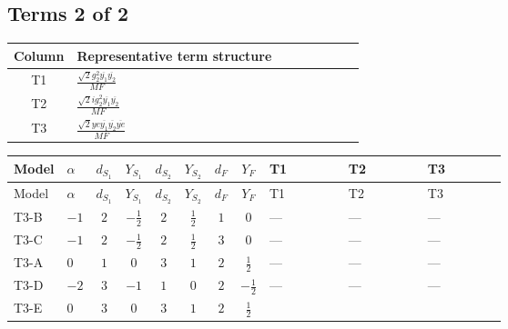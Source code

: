 \documentclass[8pt]{article}
\begin{document}
\begin{landscape}
\subsection*{Terms 2 of 2}
\begin{center}
\begin{tabular}{@{}c >{\raggedright\arraybackslash}p{0.82\linewidth}@{}}
\toprule
Column & Representative term structure \\
\midrule
T1 & \(\displaystyle \frac{\sqrt{2} g_{2}^{2} \overline{y_{1}} \overline{y_{2}}}{MF}\) \\
\midrule
T2 & \(\displaystyle \frac{\sqrt{2} i g_{2}^{2} \overline{y_{1}} \overline{y_{2}}}{MF}\) \\
\midrule
T3 & \(\displaystyle \frac{\sqrt{2} ye \overline{y_{1}} \overline{y_{2}} \overline{ye}}{MF}\) \\
\midrule
\bottomrule
\end{tabular}
\end{center}
\smallskip
\tiny
\begin{longtable}{@{}llcccccc >{\raggedright\arraybackslash}p{0.21\linewidth} >{\raggedright\arraybackslash}p{0.21\linewidth} >{\raggedright\arraybackslash}p{0.21\linewidth}@{}}
\toprule
Model & $\alpha$ & $d_{S_1}$ & $Y_{S_1}$ & $d_{S_2}$ & $Y_{S_2}$ & $d_F$ & $Y_F$ & T1 & T2 & T3 \\
\midrule
\endfirsthead
\toprule
Model & $\alpha$ & $d_{S_1}$ & $Y_{S_1}$ & $d_{S_2}$ & $Y_{S_2}$ & $d_F$ & $Y_F$ & T1 & T2 & T3 \\
\midrule
\endhead
T3-B & $-1$ & $2$ & $-\frac{1}{2}$ & $2$ & $\frac{1}{2}$ & $1$ & $0$ & --- & --- & --- \\
\midrule
T3-C & $-1$ & $2$ & $-\frac{1}{2}$ & $2$ & $\frac{1}{2}$ & $3$ & $0$ & --- & --- & --- \\
\midrule
T3-A & $0$ & $1$ & $0$ & $3$ & $1$ & $2$ & $\frac{1}{2}$ & --- & --- & --- \\
\midrule
T3-D & $-2$ & $3$ & $-1$ & $1$ & $0$ & $2$ & $-\frac{1}{2}$ & --- & --- & --- \\
\midrule
T3-E & $0$ & $3$ & $0$ & $3$ & $1$ & $2$ & $\frac{1}{2}$ & \scriptsize\adjustbox{max width=\linewidth}{$\begin{gathered} \frac{33 \sqrt{2} g_{2}^{2} \overline{y_{1}} \overline{y_{2}}}{16 MF}\end{gathered}$} & \scriptsize\adjustbox{max width=\linewidth}{$\begin{gathered} - \frac{\sqrt{2} i g_{2}^{2} \overline{y_{1}} \overline{y_{2}}}{4 MF}\end{gathered}$} & \scriptsize\adjustbox{max width=\linewidth}{$\begin{gathered} - \frac{\sqrt{2} ye \overline{y_{1}} \overline{y_{2}} \overline{ye}}{8 MF}\end{gathered}$} \\
\midrule
\bottomrule
\end{longtable}
\clearpage

\end{landscape}
\end{document}
